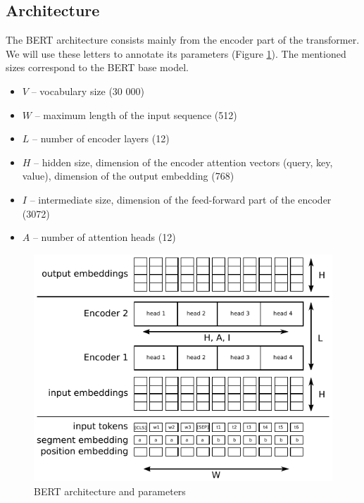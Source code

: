 \documentclass[
  printed, %
  color,   %
  table,   %
  oneside, %
  lof,     %
  lot,     %
]{fithesis3}
\begin{document}
\subsection{Architecture}
\label{sec:bert_arch}
The BERT architecture consists mainly from the encoder part of the transformer. We will use these letters to annotate its parameters (Figure \ref{fig:bert}). The mentioned sizes correspond to the BERT base model.
\begin{itemize}
\itemsep0em 
\item $V$ -- vocabulary size (30 000)
\item $W$ -- maximum length of the input sequence (512)
\item $L$ -- number of encoder layers (12)
\item $H$ -- hidden size, dimension of the encoder attention vectors (query, key, value), dimension of the output embedding (768)
\item $I$ -- intermediate size, dimension of the feed-forward part of the encoder (3072)
\item $A$ -- number of attention heads (12)
\end{itemize}


\begin{figure}[h]
  \begin{center}
    \includegraphics[width=\linewidth]{img/bert_emb.pdf}
  \end{center}
  \vspace{-0.5cm}
  \caption{BERT architecture and parameters}
  \label{fig:bert}
\end{figure}
\end{document}
